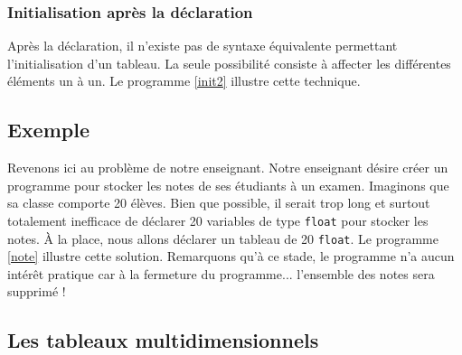 \documentclass[a4paper,11pt]{book}
\theoremstyle{definition}
\begin{document}
\subsubsection{Initialisation après la déclaration}
Après la déclaration, il n'existe pas de syntaxe équivalente permettant l'initialisation d'un tableau. La seule possibilité consiste à affecter les différentes éléments un à un. Le programme \ref{init2} illustre cette technique.\\



\subsection{Exemple}

Revenons ici au problème de notre enseignant. Notre enseignant désire créer un programme pour stocker les notes de ses étudiants à un examen. Imaginons que sa classe comporte 20 élèves. Bien que possible, il serait trop long et surtout totalement inefficace de déclarer 20 variables de type \texttt{float} pour stocker les notes. \`A la place, nous allons déclarer un tableau de 20 \texttt{float}. Le programme \ref{note} illustre cette solution. Remarquons qu'à ce stade, le programme n'a aucun intérêt pratique car à la fermeture du programme... l'ensemble des notes sera supprimé !



\subsection{Les tableaux multidimensionnels}\label{sectiontab2}
\end{document}
